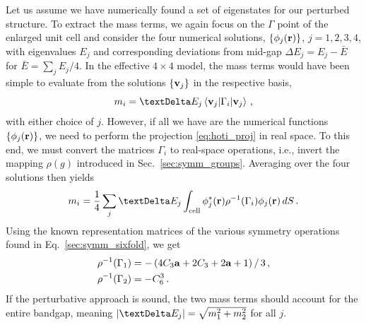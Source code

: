 Let us assume we have numerically found a set of eigenstates for our perturbed structure. To extract the mass terms, we again focus on the $\Gamma$ point of the enlarged unit cell and consider the four numerical solutions, $\{ \phi_j(\vb{r})\}$, $j=1,2,3,4$, with eigenvalues $E_j$ and corresponding deviations from mid-gap $\Delta E_j=E_j-\bar{E}$ for $\bar{E}=\sum_j E_j/4$. In the effective $4 \times 4$ model, the mass terms would have been simple to evaluate from the solutions $\{ \vb{v}_j \}$ in the respective basis,
\begin{equation} \label{eq:hoti_proj}
m_i = \Delta E_j \expval{\Gamma_i}{\vb{v}_j} \,,
\end{equation}
with either choice of $j$. 
However, if all we have are the numerical functions $\{ \phi_j (\vb{r}) \}$, we need to perform the projection \eqref{eq:hoti_proj} in real space. To this end, we must convert the matrices $\Gamma_i$ to real-space operations, i.e., invert the mapping $\rho(g)$ introduced in Sec.~\ref{sec:symm_groups}. Averaging over the four solutions then yields
\begin{equation}
\label{eq:hoti_massformula}
m_i = \frac{1}{4} \sum_j \Delta E_j  \int_{\text{cell}} \phi_j^*(\vb{r}) \rho^{-1}(\Gamma_i) \phi_j(\vb{r})  \, dS\,.
\end{equation}
Using the known representation matrices of the various symmetry operations found in Eq.~\eqref{sec:symm_sixfold}, we get
\begin{equation} \label{eq:hoti_bulksig}
\begin{aligned}
\rho^{-1}(\Gamma_1) &= -\left(4C_3 \vb{a} + 2 C_3 + 2 \vb{a} + 1 \right) /\, 3\,, \\
\rho^{-1}(\Gamma_2) &= -C_6^3\,.
\end{aligned}
\end{equation}
If the perturbative approach is sound, the two mass terms should account for the entire bandgap, meaning $\abs{\Delta E_j} = \sqrt{m_1^2 + m_2^2}$ for all $j$.

